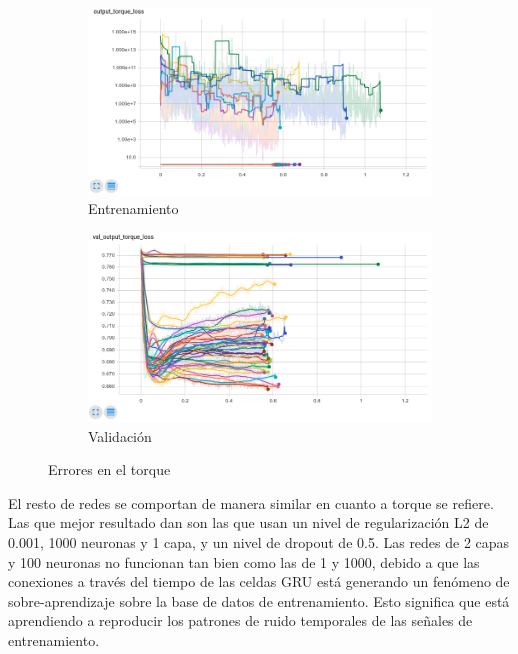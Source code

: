 \begin{figure}[thb]
	\begin{subfigure}[b]{0.45\textwidth}
		\centering
		\includegraphics[width=\linewidth]{imagenes/resultados/torque_loss_all.png}
		\caption{Entrenamiento}
		\label{fig:resultados/torque_loss_all}
	\end{subfigure}
	\begin{subfigure}[b]{0.45\textwidth}
		\centering
		\includegraphics[width=\linewidth]{imagenes/resultados/val_torque_loss_all.png}
		\caption{Validación}
		\label{fig:resultados/val_torque_loss_all}
	\end{subfigure}
	\caption{Errores en el torque}
	\label{fig:resultados/torque_all}
\end{figure}

El resto de redes se comportan de manera similar en cuanto a torque se refiere. Las que mejor resultado dan son las que usan un nivel de regularización L2 de 0.001, 1000 neuronas y 1 capa, y un nivel de dropout de 0.5. Las redes de 2 capas y 100 neuronas no funcionan tan bien como las de 1 y 1000, debido a que las conexiones a través del tiempo de las celdas GRU está generando un fenómeno de sobre-aprendizaje sobre la base de datos de entrenamiento. Esto significa que está aprendiendo a reproducir los patrones de ruido temporales de las señales de entrenamiento.

